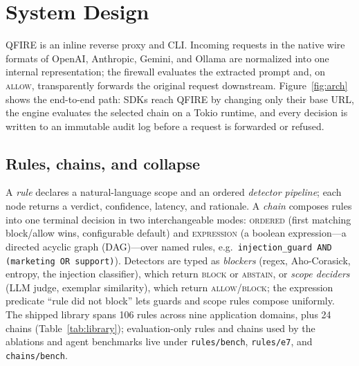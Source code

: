 \documentclass[11pt]{article}
\begin{document}
\section{System Design}
QFIRE is an inline reverse proxy and CLI. Incoming requests in the native wire
formats of OpenAI, Anthropic, Gemini, and Ollama are normalized into one internal
representation; the firewall evaluates the extracted prompt and, on \textsc{allow},
transparently forwards the original request downstream. Figure~\ref{fig:arch}
shows the end-to-end path: SDKs reach QFIRE by changing only their base URL, the
engine evaluates the selected chain on a Tokio runtime, and every decision is
written to an immutable audit log before a request is forwarded or refused.

\subsection{Rules, chains, and collapse}
A \emph{rule} declares a natural-language scope and an ordered \emph{detector
pipeline}; each node returns a verdict, confidence, latency, and rationale. A
\emph{chain} composes rules into one terminal decision in two interchangeable
modes: \textsc{ordered} (first matching block/allow wins, configurable default)
and \textsc{expression} (a boolean expression---a directed acyclic graph (DAG)---over named rules, e.g.\
\texttt{injection\_guard AND (marketing OR support)}). Detectors are typed as
\emph{blockers} (regex, Aho-Corasick, entropy, the injection classifier), which
return \textsc{block} or \textsc{abstain}, or \emph{scope deciders} (LLM judge,
exemplar similarity), which return \textsc{allow}/\textsc{block}; the expression
predicate ``rule did not block'' lets guards and scope rules compose uniformly.
The shipped library spans 106 rules across nine application domains, plus 24 chains
(Table~\ref{tab:library}); evaluation-only rules and chains used by the ablations and
agent benchmarks live under \texttt{rules/bench}, \texttt{rules/e7}, and
\texttt{chains/bench}.
\end{document}

